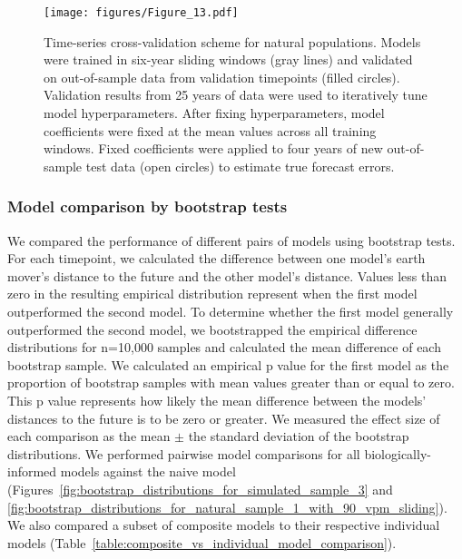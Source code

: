 \begin{figure}
  \begin{center}
  \texttt{[image: figures/Figure\_13.pdf]}
  \caption{
  Time-series cross-validation scheme for natural populations.
  Models were trained in six-year sliding windows (gray lines) and validated on out-of-sample data from validation timepoints (filled circles).
  Validation results from 25 years of data were used to iteratively tune model hyperparameters.
  After fixing hyperparameters, model coefficients were fixed at the mean values across all training windows.
  Fixed coefficients were applied to four years of new out-of-sample test data (open circles) to estimate true forecast errors.
  }
  \label{fig:cross_validation_for_natural_populations}
  \end{center}
\end{figure}

\subsubsection*{Model comparison by bootstrap tests}

We compared the performance of different pairs of models using bootstrap tests.
For each timepoint, we calculated the difference between one model's earth mover's distance to the future and the other model's distance.
Values less than zero in the resulting empirical distribution represent when the first model outperformed the second model.
To determine whether the first model generally outperformed the second model, we bootstrapped the empirical difference distributions for n=10,000 samples and calculated the mean difference of each bootstrap sample.
We calculated an empirical p value for the first model as the proportion of bootstrap samples with mean values greater than or equal to zero.
This p value represents how likely the mean difference between the models' distances to the future is to be zero or greater.
We measured the effect size of each comparison as the mean $\pm$ the standard deviation of the bootstrap distributions.
We performed pairwise model comparisons for all biologically-informed models against the naive model (Figures~\ref{fig:bootstrap_distributions_for_simulated_sample_3} and \ref{fig:bootstrap_distributions_for_natural_sample_1_with_90_vpm_sliding}).
We also compared a subset of composite models to their respective individual models (Table~\ref{table:composite_vs_individual_model_comparison}).

